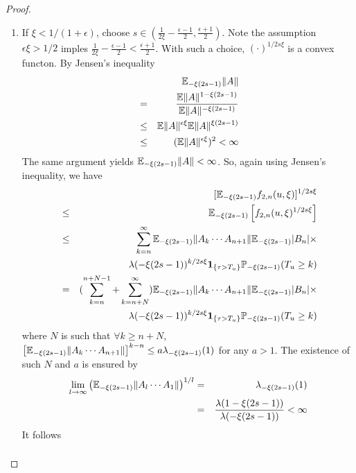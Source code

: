 \documentclass{article}
\begin{document}
\begin{proof}
\begin{enumerate}
\begin{enumerate}
\begin{enumerate}
      \item If $\xi < 1/(1 + \epsilon)$, choose $s \in (\frac{1}{2\xi}
        - \frac{\epsilon - 1}{2}, \frac{\epsilon + 1}{2})$. Note the
        assumption $\epsilon\xi > 1/2$ imples $\frac{1}{2\xi} -
        \frac{\epsilon - 1}{2} < \frac{\epsilon + 1}{2}$. With such a
        choice, $(\cdot)^{1/2s\xi}$ is a convex functon. By Jensen's inequality 
        \begin{eqnarray*}
          && \mathbb{E}_{-\xi(2s - 1)} \|A\| \\
          &=& \frac{\mathbb{E} \|A\|^{1-\xi(2s - 1)}}{\mathbb{E} \|A\|^{-\xi(2s - 1)}}
          \\
          &\leq& \mathbb{E} \|A\|^{\epsilon \xi} \mathbb{E} \|A\|^{\xi(2s - 1)} \\
          &\leq& (\mathbb{E} \|A\|^{\epsilon \xi})^2 < \infty
        \end{eqnarray*}
        The same argument yields $\mathbb{E}_{-\xi(2s - 1)} \|A\| < \infty$.
        So, again using Jensen's inequality, we have
        \begin{eqnarray*}
          && [\mathbb{E}_{-\xi(2s - 1)} f_{2,n}(u,\xi)]^{1/2s\xi} \\
          &\leq& \mathbb{E}_{-\xi(2s - 1)} \left[ f_{2,n}(u,\xi)^{1/2s\xi} \right]\\
          &\leq& \sum_{k=n}^\infty
          \mathbb{E}_{-\xi(2s - 1)}\|A_k \cdots A_{n+1}\|
          \mathbb{E}_{-\xi(2s - 1)}|B_n| \times \\
          && \lambda(-\xi(2s - 1))^{k/2s\xi} \mathbf{1}_{\{\tau > T_u\}}
          \mathbb{P}_{-\xi(2s - 1)}(T_u \geq k) \\
          &=& (\sum_{k=n}^{n+N-1} + \sum_{k=n+N}^\infty)
          \mathbb{E}_{-\xi(2s - 1)}\|A_k \cdots A_{n+1}\|
          \mathbb{E}_{-\xi(2s - 1)}|B_n| \times \\
          && \lambda(-\xi(2s - 1))^{k/2s\xi} \mathbf{1}_{\{\tau > T_u\}}
          \mathbb{P}_{-\xi(2s - 1)}(T_u \geq k)
        \end{eqnarray*}
        where $N$ is such that $\forall k \geq n+N$,
        $\left[\mathbb{E}_{-\xi(2s - 1)} \|A_k \cdots A_{n+1}\|\right]^{k-n}
        \leq a \lambda_{-\xi(2s - 1)}(1)$ for any $a > 1$. The
        existence of such $N$ and $a$ is ensured by
      \begin{eqnarray*}
      \lim_{l \to \infty} \left(
        \mathbb{E}_{-\xi(2s - 1)}\|A_l \cdots A_1\|
        \right)^{1/l} &=& \lambda_{-\xi(2s - 1)}(1) \\
      &=& \frac{\lambda(1 - \xi(2s - 1))}{\lambda(-\xi(2s - 1))} < \infty
      \end{eqnarray*}
      It follows
      \begin{eqnarray*}

\end{eqnarray*}
\end{enumerate}
\end{enumerate}
\end{enumerate}
\end{proof}
\end{document}
